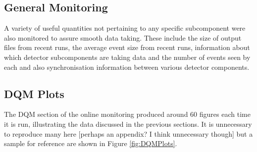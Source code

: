 \subsection{General Monitoring}\label{sec:GeneralMonitoring}

A variety of useful quantities not pertaining to any specific subcomponent were also monitored to assure smooth data taking.  These include the size of output files from recent runs, the average event size from recent runs, information about which detector subcomponents are taking data and the number of events seen by each and also synchronisation information between various detector components.

\subsection{DQM Plots}\label{sec:DQMPlots}

The DQM section of the online monitoring produced around 60 figures each time it is run, illustrating the data discussed in the previous sections.  It is unnecessary to reproduce many here [perhaps an appendix? I think unnecessary though] but a sample for reference are shown in Figure \ref{fig:DQMPlots}.

